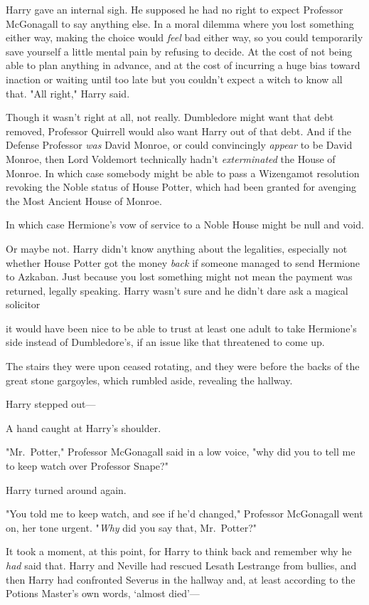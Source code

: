 Harry gave an internal sigh. He supposed he had no right to expect Professor
McGonagall to say anything else. In a moral dilemma where you lost something
either way, making the choice would \emph{feel} bad either way, so you could
temporarily save yourself a little mental pain by refusing to decide. At the
cost of not being able to plan anything in advance, and at the cost of
incurring a huge bias toward inaction or waiting until too late{\el} but you
couldn't expect a witch to know all that. "All right," Harry said.

Though it wasn't right at all, not really. Dumbledore might want that debt
removed, Professor Quirrell would also want Harry out of that debt. And if the
Defense Professor \emph{was} David Monroe, or could convincingly \emph{appear}
to be David Monroe, then Lord Voldemort technically hadn't \emph{exterminated}
the House of Monroe. In which case somebody might be able to pass a Wizengamot
resolution revoking the Noble status of House Potter, which had been granted
for avenging the Most Ancient House of Monroe.

In which case Hermione's vow of service to a Noble House might be null and void.

Or maybe not. Harry didn't know anything about the legalities, especially not
whether House Potter got the money \emph{back} if someone managed to send
Hermione to Azkaban. Just because you lost something might not mean the payment
was returned, legally speaking. Harry wasn't sure and he didn't dare ask a
magical solicitor{\el}

{\el} it would have been nice to be able to trust at least one adult to take
Hermione's side instead of Dumbledore's, if an issue like that threatened to
come up.

The stairs they were upon ceased rotating, and they were before the backs of
the great stone gargoyles, which rumbled aside, revealing the hallway.

Harry stepped out—

A hand caught at Harry's shoulder.

"Mr.~Potter," Professor McGonagall said in a low voice, "why did you to tell me
to keep watch over Professor Snape?"

Harry turned around again.

"You told me to keep watch, and see if he'd changed," Professor McGonagall went
on, her tone urgent. "\emph{Why} did you say that, Mr.~Potter?"

It took a moment, at this point, for Harry to think back and remember why he
\emph{had} said that. Harry and Neville had rescued Lesath Lestrange from
bullies, and then Harry had confronted Severus in the hallway and, at least
according to the Potions Master's own words, `almost died'—

